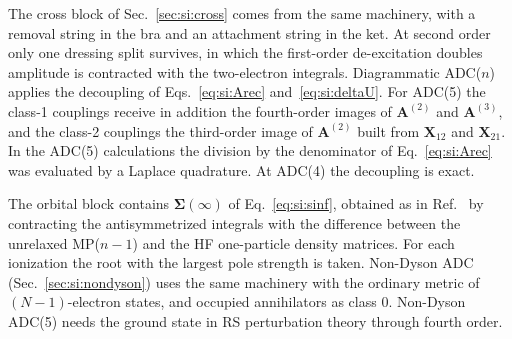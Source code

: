 \documentclass[aip,jcp,reprint,noshowkeys,superscriptaddress]{revtex4-2}
\theoremstyle{plain}
\theoremstyle{definition}
\theoremstyle{remark}
\def\maintextdir{../}}}
\begin{document}
The cross block of Sec.~\ref{sec:si:cross} comes from the same machinery, with a removal string in the bra and an attachment string in the ket. At second order only one dressing split survives, in which the first-order de-excitation doubles amplitude is contracted with the two-electron integrals. Diagrammatic ADC($n$) applies the decoupling of Eqs.~\eqref{eq:si:Arec} and~\eqref{eq:si:deltaU}. For ADC(5) the class-1 couplings receive in addition the fourth-order images of $\mathbf{A}^{(2)}$ and $\mathbf{A}^{(3)}$, and the class-2 couplings the third-order image of $\mathbf{A}^{(2)}$ built from $\mathbf{X}_{12}$ and $\mathbf{X}_{21}$. In the ADC(5) calculations the division by the denominator of Eq.~\eqref{eq:si:Arec} was evaluated by a Laplace quadrature.\cite{Almlof_1991,Takatsuka_2008,Kaltak_2014}
At ADC(4) the decoupling is exact.

The orbital block contains $\pmb{\Sigma}(\infty)$ of Eq.~\eqref{eq:si:sinf}, obtained as in Ref.~ by contracting the antisymmetrized integrals with the difference between the unrelaxed MP($n-1$) and the HF one-particle density matrices. For each ionization the root with the largest pole strength is taken.
Non-Dyson ADC (Sec.~\ref{sec:si:nondyson}) uses the same machinery with the ordinary metric of $(N-1)$-electron states, and occupied annihilators as class 0.
Non-Dyson ADC(5) needs the ground state in RS perturbation theory through fourth order.


\end{document}
